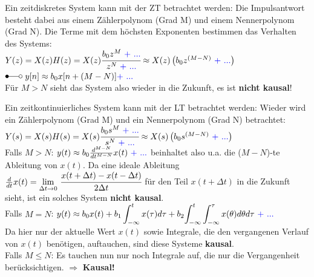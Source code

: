 \documentclass[a4paper,11pt]{article}
\begin{document}
\vspace{0.3cm}
Ein zeitdiskretes System kann mit der ZT betrachtet werden: Die Impulsantwort besteht dabei aus einem Zählerpolynom (Grad M) und einem Nennerpolynom (Grad N). Die Terme mit dem höchsten Exponenten bestimmen das Verhalten des Systems:
\\$Y(z)=X(z)H(z)=X(z)\cfrac{b_0z^M\ {\color{blue}+\ ...}}{z^N\ {\color{blue}+\ ...}}\approx X(z)\left(b_0z^{(M-N)}\ {\color{blue}+\ ...}\right)$\\$\Laplace\ y[n]\approx b_0x[n+(M-N)]{\color{blue}+\ ...}$
\vspace{0.2cm}\\Für $M>N$ sieht das System also wieder in die Zukunft, es ist \textbf{nicht kausal}!
\par\vspace{0.8cm}
Ein zeitkontinuierliches System kann mit der LT betrachtet werden: Wieder wird ein Zählerpolynom (Grad M) und ein Nennerpolynom (Grad N) betrachtet:
\\$Y(s)=X(s)H(s)=X(s)\cfrac{b_0s^M\ {\color{blue}+\ ...}}{s^N\ {\color{blue}+\ ...}}\approx X(s)\left(b_0s^{(M-N)}\ {\color{blue}+\ ...}\right)$
\vspace{0.4cm}\\Falls $M>N$: $y(t)\approx b_0\frac{d^{M-N}}{dt^{M-N}}x(t)\ {\color{blue}+\ ...}$ beinhaltet also u.a. die ($M-N$)-te Ableitung von $x(t)$. Da eine ideale Ableitung $\frac{d}{dt}x(t)=\displaystyle{\lim_{\Delta t\rightarrow0}}\ \cfrac{x(t+\Delta t)-x(t-\Delta t)}{2\Delta t}$ für den Teil $x(t+\Delta t)$ \glqq in die Zukunft sieht\grqq, ist ein solches System \textbf{nicht kausal}.
\vspace{0.4cm}\\Falls $M=N$: $y(t)\approx b_0x(t)+b_1\displaystyle\int_{-\infty}^{t}x(\tau)d\tau + b_2\displaystyle{\int_{-\infty}^{t}\int_{-\infty}^{\tau}x(\theta)d\theta d\tau}\ {\color{blue}+\ ...}$
\\Da hier nur der aktuelle Wert $x(t)$ sowie Integrale, die den vergangenen Verlauf von $x(t)$ benötigen, auftauchen, sind diese Systeme \textbf{kausal}.
\vspace{0.4cm}
\\Falls $M\leq N$: Es tauchen nun nur noch Integrale auf, die nur die Vergangenheit berücksichtigen. $\Rightarrow$ \textbf{Kausal!}
\vspace{0.4cm}\\ 
\end{document}
